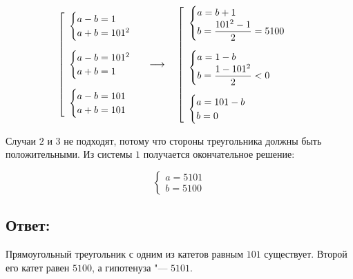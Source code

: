 \begin {equation*}
    \left[
        \begin {array} {l} 
            \begin {cases}
                a - b = 1
                \\
                a + b = 101^2
            \end {cases}
            \vspace{1em} \\
            \begin {cases}
                a - b = 101^2
                \\
                a + b = 1
            \end {cases}
            \vspace{1em} \\
            \begin {cases}
                a - b = 101
                \\
                a + b = 101
            \end {cases}
        \end {array}
    \right.
    \longrightarrow\quad
    \left[
        \begin {array} {l}
            \begin {cases}
                a = b + 1
                \\
                b = \dfrac{101^2 - 1}{2} = 5100
            \end {cases}
            \vspace{1em} \\
            \begin {cases}
                a = 1 - b
                \\
                b = \dfrac{1 - 101^2}{2} < 0
            \end {cases}
            \vspace{1em} \\
            \begin {cases}
                a = 101 - b
                \\
                b = 0
            \end {cases}
        \end {array}
    \right.
\end {equation*}

Случаи $2$ и $3$ не подходят, потому что стороны треугольника должны быть положительными. Из системы
$1$ получается окончательное решение:

\begin {equation*}
    \begin {cases}
        a = 5101
        \\
        b = 5100
    \end {cases}
\end {equation*}

\subsection*{Ответ:}
Прямоугольный треугольник с одним из катетов равным $101$ существует. Второй его катет равен
$5100$, а гипотенуза "--- $5101$. 
